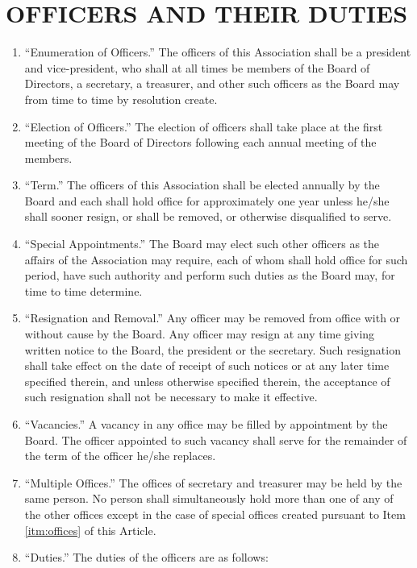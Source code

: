 \documentclass[10pt, letterpaper]{article}
\begin{document}
\section{OFFICERS AND THEIR DUTIES}
\begin{enumerate}
  \item ``Enumeration of Officers.''
    The officers of this Association shall be a president and vice-president, who shall at all times be members of the Board of Directors, a secretary, a treasurer, and other such officers as the Board may from time to time by resolution create.
  \item ``Election of Officers.''
    The election of officers shall take place at the first meeting of the Board of Directors following each annual meeting of the members.
  \item ``Term.''
    The officers of this Association shall be elected annually by the Board and each shall hold office for approximately one year unless he/she shall sooner resign, or shall be removed, or otherwise disqualified to serve.
  \item ``Special Appointments.'' \label{itm:offices}
    The Board may elect such other officers as the affairs of the Association may require, each of whom shall hold office for such period, have such authority and perform such duties as the Board may, for time to time determine.
  \item ``Resignation and Removal.''
    Any officer may be removed from office with or without cause by the Board.
    Any officer may resign at any time giving written notice to the Board, the president or the secretary.
    Such resignation shall take effect on the date of receipt of such notices or at any later time specified therein, and unless otherwise specified therein, the acceptance of such resignation shall not be necessary to make it effective.
  \item ``Vacancies.''
    A vacancy in any office may be filled by appointment by the Board.
    The officer appointed to such vacancy shall serve for the remainder of the term of the officer he/she replaces.
  \item ``Multiple Offices.''
    The offices of secretary and treasurer may be held by the same person.
    No person shall simultaneously hold more than one of any of the other offices except in the case of special offices created pursuant to Item \ref{itm:offices} of this Article. 
  \item ``Duties.''
    The duties of the officers are as follows:
    \begin{itemize}

\end{itemize}
\end{enumerate}
\end{document}
